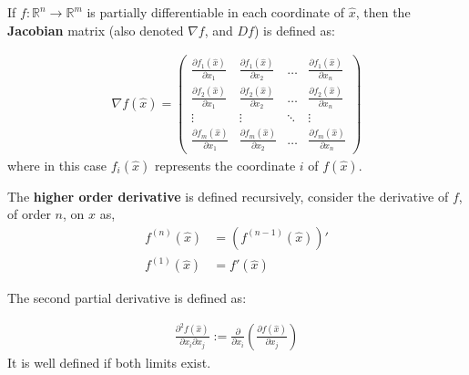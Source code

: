 \documentclass[aspectratio=169]{beamer}
\begin{document}
\begin{frame}
    \begin{definition}
        If $f:\mathbb{R}^n\rightarrow\mathbb{R}^m$ is partially differentiable in each coordinate of $\hat{x}$, then the \textbf{Jacobian} matrix (also denoted $\nabla f$, and $D f$) is defined as:
    
    \begin{align*}
        \nabla f(\hat{x}) = \left(\begin{array}{cccc}\frac{\partial f_1(\hat{x})}{\partial x_1} & \frac{\partial f_1(\hat{x})}{\partial x_2} & \ldots & \frac{\partial f_1(\hat{x})}{\partial x_n} \\
        \frac{\partial f_2(\hat{x})}{\partial x_1} & \frac{\partial f_2(\hat{x})}{\partial x_2} & \ldots & \frac{\partial f_2(\hat{x})}{\partial x_n} \\
        \vdots & \vdots & \ddots & \vdots \\
        \frac{\partial f_m(\hat{x})}{\partial x_1} & \frac{\partial f_m(\hat{x})}{\partial x_2}& \ldots & \frac{\partial f_m(\hat{x})}{\partial x_n}
        \end{array}\right)
    \end{align*}
    where in this case $f_i(\hat{x})$ represents the coordinate $i$ of $f(\hat{x})$.
    \end{definition}
\end{frame}

\begin{frame}
    \begin{definition}
    
    The \textbf{higher order derivative} is defined recursively, consider the derivative of $f$, of order $n$, on $\hat{x}$ as,
    \begin{align*}
      f^{(n)}(\hat{x})&=(f^{(n-1)}(\hat{x}))'\\
      f^{(1)}(\hat{x})&=f'(\hat{x})  
    \end{align*}
    
    \end{definition}
    
    \begin{definition}
        The second partial derivative is defined as:
        
        \begin{align*}
            \frac{\partial^2f(\hat{x})}{\partial x_i \partial x_j}  := \frac{\partial}{\partial x_i}\left(\frac{\partial f(\hat{x})}{\partial x_j}\right)
        \end{align*}
        It is well defined if both limits exist.
    \end{definition}
\end{frame}
\end{document}
